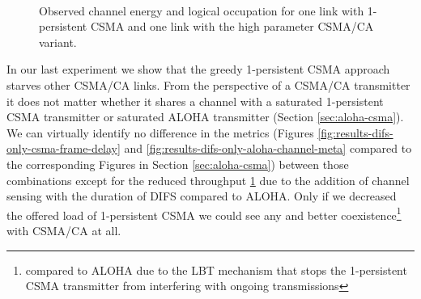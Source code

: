 \begin{figure}[tb]
	\label{fig:results-difs-only-csma-channel-meta}
	\begin{center}
		\\
	\end{center}
	\caption{Observed channel energy and logical occupation for one link with 1-persistent CSMA and one link with the high parameter CSMA/CA variant.}
\end{figure}

In our last experiment we show that the greedy 1-persistent CSMA approach starves other CSMA/CA links. From the perspective of a CSMA/CA transmitter it does not matter whether it shares a channel with a saturated 1-persistent CSMA transmitter or saturated ALOHA transmitter (Section \ref{sec:aloha-csma}). We can virtually identify no difference in the metrics (Figures \ref{fig:results-difs-only-csma-frame-delay} and \ref{fig:results-difs-only-aloha-channel-meta} compared to the corresponding Figures in Section \ref{sec:aloha-csma}) between those combinations except for the reduced throughput \ref{fig:results-difs-only-csma-channel-meta} due to the addition of channel sensing with the duration of DIFS compared to ALOHA. Only if we decreased the offered load of 1-persistent CSMA we could see any and better coexistence\footnote{compared to ALOHA due to the LBT mechanism that stops the 1-persistent CSMA transmitter from interfering with ongoing transmissions} with CSMA/CA at all.

